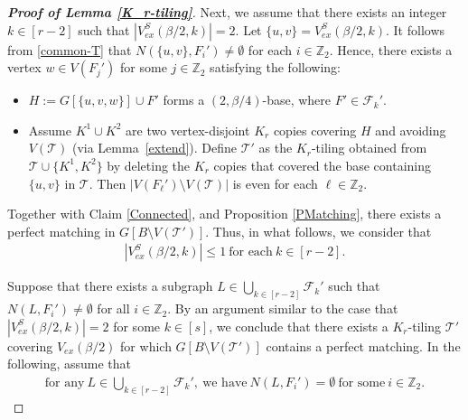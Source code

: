 \documentclass[11pt, a4paper]{article}
\theoremstyle{definition}
\newcommand{\<}{\subseteq}
\begin{document}
\begin{proof}[\bf Proof of Lemma \ref{K_r-tiling}]
 Next, we assume that there exists an integer $k\in[r-2]$ such that $|V_{ex}^S(\beta/2,k)|=2$. Let $\{u,v\}=V_{ex}^S(\beta/2,k)$. It follows from \eqref{common-T} that $N(\{u,v\},F_i')\ne \emptyset$ for each $i\in \mathbb{Z}_2$. Hence, there exists a vertex $w\in V(F_j')$ for some $j\in \mathbb{Z}_2$ satisfying the following:
 \begin{itemize}
     \item $H:=G[\{u,v,w\}]\cup F'$ forms a $(2,\beta/4)$-base, where $F'\in \mathcal{F}_k'$.
     \item Assume $K^1\cup K^2$ are two vertex-disjoint $K_r$ copies covering $H$ and avoiding $V(\mathcal{T})$ (via Lemma~\ref{extend}). Define $\mathcal{T}'$ as the $K_r$-tiling obtained from $\mathcal{T}\cup \{K^1, K^2\}$ by deleting the $K_r$ copies that covered the base containing $\{u,v\}$ in $\mathcal{T}$. Then $|V(F_\ell')\setminus V(\mathcal{T})|$ is even for each $\ell\in \mathbb{Z}_2$. 
 \end{itemize}  %
 Together with  Claim \ref{Connected}, and Proposition \ref{PMatching}, there exists a perfect matching in $G[B\setminus V(\mathcal{T}')]$. 
Thus, in what follows, we consider that  
\begin{align}\label{VexS}
    |V_{ex}^S(\beta/2,k)|\le 1 \ \text{for each}\ k\in[r-2].
\end{align}

Suppose that there exists a subgraph $L\in \bigcup_{k\in [r-2]}\mathcal{F}_k'$ such that $N(L,F_i')\neq \emptyset$ for all $i\in \mathbb{Z}_2$. 
{By an argument similar to the case that $|V_{ex}^S(\beta/2,k)|=2$ for some $k\in [s]$}, we conclude that there exists a $K_r$-tiling $\mathcal{T}'$ covering $V_{ex}(\beta/2)$ for which $G[B\setminus V(\mathcal{T}')]$ contains a perfect matching. 
In the following,  assume that 
\begin{align}\label{LF_k}
\text{for any}\ L\in \bigcup_{k\in[r-2]}\mathcal{F}_k', \ \text{we have}\ %
    N(L,F_i')=\emptyset \ \text{for some} \ i\in \mathbb{Z}_2.
\end{align}


\end{proof}
\end{document}
